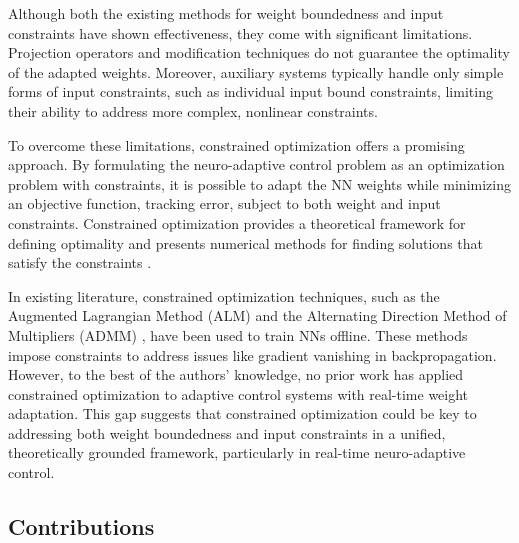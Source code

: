 \documentclass[journal]{IEEEtran}
\begin{document}
Although both the existing methods for weight boundedness and input constraints have shown effectiveness, they come with significant limitations. 
Projection operators and modification techniques do not guarantee the optimality of the adapted weights. 
Moreover, auxiliary systems typically handle only simple forms of input constraints, such as individual input bound constraints, limiting their ability to address more complex, nonlinear constraints.

To overcome these limitations, constrained optimization offers a promising approach. 
By formulating the neuro-adaptive control problem as an optimization problem with constraints, it is possible to adapt the NN weights while minimizing an objective function, \eg tracking error, subject to both weight and input constraints. 
Constrained optimization provides a theoretical framework for defining optimality and presents numerical methods for finding solutions that satisfy the constraints \cite{Nocedal:2006aa}.

In existing literature, constrained optimization techniques, such as the Augmented Lagrangian Method (ALM) \cite{Evens:2021aa} and the Alternating Direction Method of Multipliers (ADMM) \cite{Wang:2019aa,Taylor:2016aa}, have been used to train NNs offline. 
These methods impose constraints to address issues like gradient vanishing in backpropagation. 
However, to the best of the authors' knowledge, no prior work has applied constrained optimization to adaptive control systems with real-time weight adaptation. 
This gap suggests that constrained optimization could be key to addressing both weight boundedness and input constraints in a unified, theoretically grounded framework, particularly in real-time neuro-adaptive control.

\subsection{Contributions}
\end{document}
